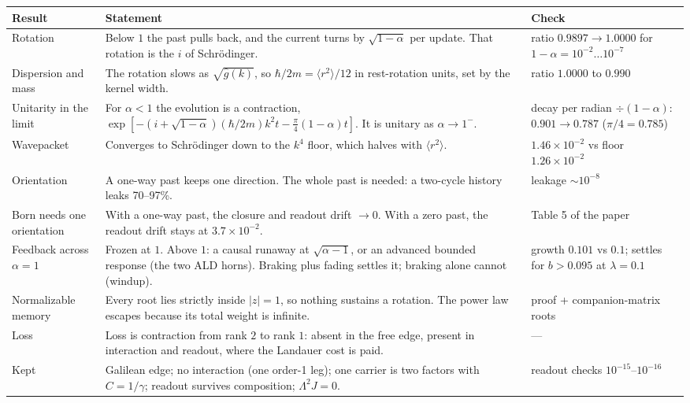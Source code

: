 \documentclass[10pt]{article}
\begin{document}
\medskip
\begin{tabularx}{\textwidth}{@{}P{3.2cm}LP{4.6cm}@{}}
\toprule
\textbf{Result} & \textbf{Statement} & \textbf{Check}\\
\midrule
Rotation & Below $1$ the past pulls back, and the current turns by $\sqrt{1-\alpha}$ per update. That rotation is the $i$ of Schr\"odinger. & ratio $0.9897\to1.0000$ for $1-\alpha=10^{-2}\dots10^{-7}$\\
Dispersion and mass & The rotation slows as $\sqrt{\hat g(k)}$, so $\hbar/2m=\langle r^2\rangle/12$ in rest-rotation units, set by the kernel width. & ratio $1.0000$ to $0.990$\\
Unitarity in the limit & For $\alpha<1$ the evolution is a contraction, $\exp[-(i+\sqrt{1-\alpha})(\hbar/2m)k^2t-\tfrac\pi4(1-\alpha)t]$. It is unitary as $\alpha\to1^-$. & decay per radian $\div(1-\alpha)$: $0.901\to0.787$ ($\pi/4=0.785$)\\
Wavepacket & Converges to Schr\"odinger down to the $k^4$ floor, which halves with $\langle r^2\rangle$. & $1.46\times10^{-2}$ vs floor $1.26\times10^{-2}$\\
Orientation & A one-way past keeps one direction. The whole past is needed: a two-cycle history leaks 70--97\%. & leakage $\sim10^{-8}$\\
Born needs one orientation & With a one-way past, the closure and readout drift $\to0$. With a zero past, the readout drift stays at $3.7\times10^{-2}$. & Table 5 of the paper\\
Feedback across $\alpha=1$ & Frozen at $1$. Above $1$: a causal runaway at $\sqrt{\alpha-1}$, or an advanced bounded response (the two ALD horns). Braking plus fading settles it; braking alone cannot (windup). & growth $0.101$ vs $0.1$; settles for $b>0.095$ at $\lambda=0.1$\\
Normalizable memory & Every root lies strictly inside $|z|=1$, so nothing sustains a rotation. The power law escapes because its total weight is infinite. & proof + companion-matrix roots\\
Loss & Loss is contraction from rank $2$ to rank $1$: absent in the free edge, present in interaction and readout, where the Landauer cost is paid. & ---\\
Kept & Galilean edge; no interaction (one order-1 leg); one carrier is two factors with $C=1/\gamma$; readout survives composition; $\Lambda^2J=0$. & readout checks $10^{-15}$--$10^{-16}$\\
\bottomrule
\end{tabularx}
\end{document}
